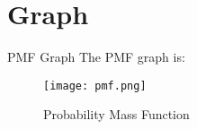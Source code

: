 \documentclass{beamer}
\begin{document}
\section{Graph}
\begin{frame}{PMF Graph}
The PMF graph is:
    \begin{figure}[!ht]
		\centering
		\texttt{[image: pmf.png]}
		\caption{Probability Mass Function}
		\label{fig1}
	\end{figure}
\end{frame}
\end{document}

